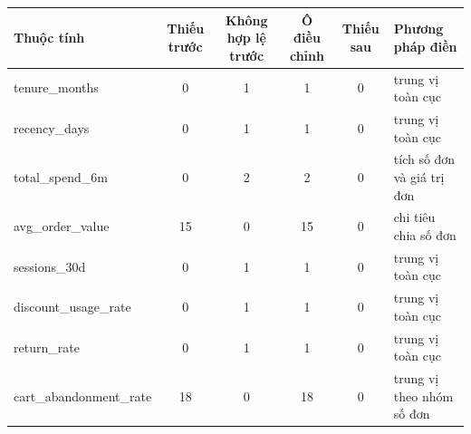\begin{tabular}{lccccl}
\toprule
Thuộc tính & Thiếu trước & Không hợp lệ trước & Ô điều chỉnh & Thiếu sau & Phương pháp điền \\
\midrule
tenure\_months & 0 & 1 & 1 & 0 & trung vị toàn cục \\
recency\_days & 0 & 1 & 1 & 0 & trung vị toàn cục \\
total\_spend\_6m & 0 & 2 & 2 & 0 & tích số đơn và giá trị đơn \\
avg\_order\_value & 15 & 0 & 15 & 0 & chi tiêu chia số đơn \\
sessions\_30d & 0 & 1 & 1 & 0 & trung vị toàn cục \\
discount\_usage\_rate & 0 & 1 & 1 & 0 & trung vị toàn cục \\
return\_rate & 0 & 1 & 1 & 0 & trung vị toàn cục \\
cart\_abandonment\_rate & 18 & 0 & 18 & 0 & trung vị theo nhóm số đơn \\
\bottomrule
\end{tabular}
